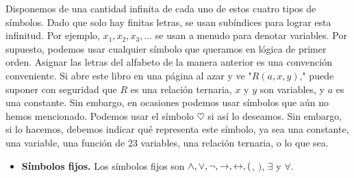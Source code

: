 \documentclass[12pt,a4paper]{book}
\newcommand{\comillas}[1]{"#1"}
\begin{document}
    Disponemos de una cantidad infinita de cada uno de estos cuatro tipos de símbolos. Dado que solo hay finitas letras, se
    usan subíndices para lograr esta infinitud. Por ejemplo, $x_{1},x_{2},x_{3},\dots$ se usan a menudo para denotar
    variables. Por supuesto, podemos usar cualquier símbolo que queramos en lógica de primer orden. Asignar las letras del
    alfabeto de la manera anterior es una convención conveniente. Si abre este libro en una página al azar y ve
    \comillas{$R(a,x,y)$,} puede suponer con seguridad que $R$ es una relación ternaria, $x$ y $y$ son variables, y $a$ es una
    constante. Sin embargo, en ocasiones podemos usar símbolos que aún no hemos mencionado. Podemos usar el símbolo $\heartsuit$
    si así lo deseamos. Sin embargo, si lo hacemos, debemos indicar qué representa este símbolo, ya sea una constante, una
    variable, una función de 23 variables, una relación ternaria, o lo que sea.

    \begin{itemize}
        \item[$\bullet$] \textbf{Símbolos fijos.} Los símbolos fijos son $\wedge,\vee,\neg,\rightarrow,\leftrightarrow,($, $)$,
        $\exists$ y $\forall$.
    \end{itemize}
\end{document}
